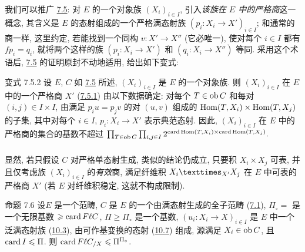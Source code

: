 

\subsubsection{}
我们\pageoriginale 可以推广 \hyperref[I.cor7.5]{7.5}:
对 $E$ 的一个对象族 $(X_i)_{i\in I}$,
引入\emph{该族在 $E$ 中的严格商}这一概念,
其含义是 $E$ 的态射组成的一个严格满态射族
$(p_i:X_i\rightarrow X')_{i\in I}$;
和通常的商一样, 这里约定, 若能找到一个同构
$v:X'\rightarrow X''$ (它必唯一),
使对每个 $i\in I$ 都有 $fp_i=q_i$,
就将两个这样的族 $(p_i:X_i\rightarrow X')$ 和
$(q_i:X_i\rightarrow X'')$ 等同.
采用这个术语后, \hyperref[I.cor7.5]{7.5} 的证明原封不动地适用,
给出如下变式:

\begin{enonce*}[remark]{变式 7.5.2}
设 $E$, $C$ 如 \hyperref[I.cor7.5]{7.5} 所述,
$(X_i)_{i\in I}$ 是 $E$ 的一个对象族.
则 $(X_i)_{i\in I}$ 在 $E$ 中的一个严格商 $X'$
(\hyperref[I.sec7.5.1]{7.5.1}) 由以下数据确定:
对每个 $T\in \operatorname{ob} C$ 和每对 $(i,j)\in I\times I$,
由满足 $p_iu=p_jv$ 的对 $(u,v)$ 组成的
$\operatorname{Hom}(T,X_i)\times \operatorname{Hom}(T,X_j)$ 的子集,
其中对每个 $i\in I$, $p_i:X_i\rightarrow X'$ 表示典范态射.
因此, $(X_i)_{i\in I}$ 在 $E$ 中的严格商的集合的基数不超过
$ \prod_{T\in \operatorname{ob} C} \prod_{i, j\in I}2^{\operatorname{card} \operatorname{Hom}(T,X_i)\times
  \operatorname{card}\operatorname{Hom}(T,X_j)}{}.
$
\end{enonce*}

\setcounter{subsubsection}{2}
\subsubsection{}
显然, 若只假设 $C$ 对严格单态射生成, 类似的结论仍成立,
只要积 $X_i\times X_j$ 可表,
并且仅考虑族 $(X_{i})_{i\in I}$ 的\emph{有效}商,
\ie 满足纤维积 $\fprod{X_i}{X_{j}}{X'}$ 在 $E$ 中可表的严格商 $X'$
(若 $E$ 对纤维积稳定, 这就不构成限制).

\begin{enonce*}{命题 7.6}
设\pageoriginale $E$ 是一个范畴,
$C$ 是 $E$ 的一个由满态射生成的全子范畴
(\hyperref[I.def7.1]{7.1}),
$\Pi_\circ=$ 是一个无限基数 $\geqslant \operatorname{card}  F\ell  C$,
$\Pi\geq \Pi_\circ$ 是一个基数,
$(u_i:X_i\rightarrow X)_{i\in I}$ 是 $E$ 中一个泛满态射族
(\hyperref[I.sec10.3]{10.3}),
由可作基变换的态射 (\hyperref[I.sec10.7]{10.7}) 组成,
源满足 $X_i\in\operatorname{ob} C$, 且 $\operatorname{card} I\leqslant \Pi$.
则 $\operatorname{card} F\ell  C_{/X}\leqslant \Pi^{\Pi_\circ}$.
\end{enonce*}

